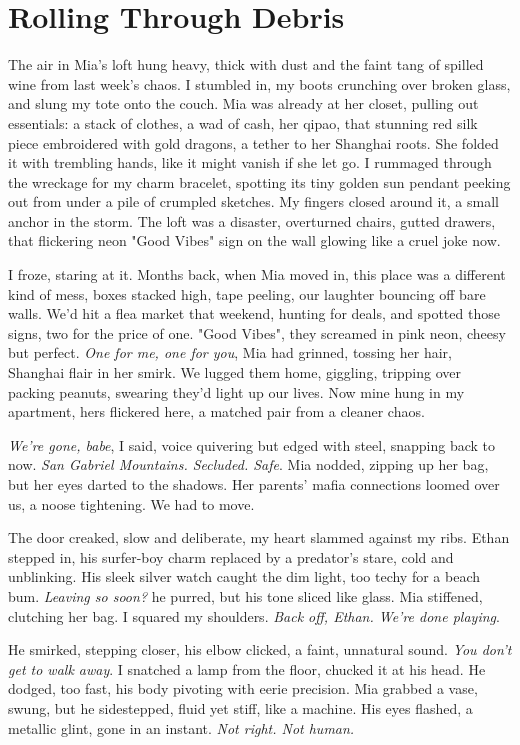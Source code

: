 \documentclass[12pt,oneside]{book} %
\begin{document}
\chapter{Rolling Through Debris}

The air in Mia’s loft hung heavy, thick with dust and the faint tang of spilled wine from last week’s chaos. I stumbled in, my boots crunching over broken glass, and slung my tote onto the couch. Mia was already at her closet, pulling out essentials: a stack of clothes, a wad of cash, her qipao, that stunning red silk piece embroidered with gold dragons, a tether to her Shanghai roots. She folded it with trembling hands, like it might vanish if she let go. I rummaged through the wreckage for my charm bracelet, spotting its tiny golden sun pendant peeking out from under a pile of crumpled sketches. My fingers closed around it, a small anchor in the storm. The loft was a disaster, overturned chairs, gutted drawers, that flickering neon "Good Vibes" sign on the wall glowing like a cruel joke now.

I froze, staring at it. Months back, when Mia moved in, this place was a different kind of mess, boxes stacked high, tape peeling, our laughter bouncing off bare walls. We’d hit a flea market that weekend, hunting for deals, and spotted those signs, two for the price of one. "Good Vibes", they screamed in pink neon, cheesy but perfect. \textit{One for me, one for you}, Mia had grinned, tossing her hair, Shanghai flair in her smirk. We lugged them home, giggling, tripping over packing peanuts, swearing they’d light up our lives. Now mine hung in my apartment, hers flickered here, a matched pair from a cleaner chaos.

\textit{We’re gone, babe}, I said, voice quivering but edged with steel, snapping back to now. \textit{San Gabriel Mountains. Secluded. Safe}. Mia nodded, zipping up her bag, but her eyes darted to the shadows. Her parents’ mafia connections loomed over us, a noose tightening. We had to move.

The door creaked, slow and deliberate, my heart slammed against my ribs. Ethan stepped in, his surfer-boy charm replaced by a predator’s stare, cold and unblinking. His sleek silver watch caught the dim light, too techy for a beach bum. \textit{Leaving so soon?} he purred, but his tone sliced like glass. Mia stiffened, clutching her bag. I squared my shoulders. \textit{Back off, Ethan. We’re done playing}.

He smirked, stepping closer, his elbow clicked, a faint, unnatural sound. \textit{You don’t get to walk away}. I snatched a lamp from the floor, chucked it at his head. He dodged, too fast, his body pivoting with eerie precision. Mia grabbed a vase, swung, but he sidestepped, fluid yet stiff, like a machine. His eyes flashed, a metallic glint, gone in an instant. \textit{Not right. Not human.}
\end{document}
